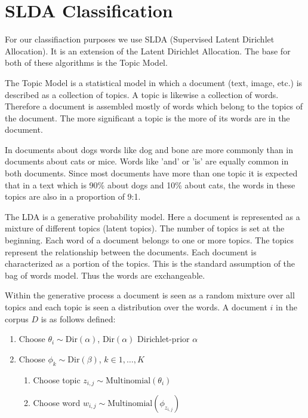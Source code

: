\documentclass[12pt,paper=a4,nenglish]{scrreprt}
\begin{document}
\section{SLDA Classification}
\label{sec:slda_classification}

For our classifiaction purposes we use SLDA (Supervised Latent Dirichlet Allocation). 
It is an extension of the Latent Dirichlet Allocation. 
The base for both of these algorithms is the Topic Model.

The Topic Model is a statistical model in which a document (text, image, etc.) is described as a collection of topics. 
A topic is likewise a collection of words. Therefore a document is assembled
mostly of words which belong to the topics of the document.
The more significant a topic is the more of its words are in the document.

In documents about dogs words like dog and bone are more commonly than in
documents about cats or mice.
Words like 'and' or 'is' are equally common in both documents. 
Since most documents have more than one topic it is expected that in a text
which is 90\% about dogs and 10\% about cats, the words in these topics are also
in a proportion of 9:1.

The LDA is a generative probability model. 
Here a document is represented as a mixture of different topics (latent topics). 
The number of topics is set at the beginning. Each word of a document belongs to one or more topics. 
The topics represent the relationship between the documents. Each document is characterized as a portion of the topics. 
This is the standard assumption of the bag of words model. 
Thus the words are exchangeable.

Within the generative process a document is seen as a random mixture over all
topics and each topic is seen a distribution over the words.
A document $ i $ in the corpus $ D $ is as follows defined:

\begin{enumerate}
\item Choose $ \theta_i \sim \text{Dir}(\alpha) $, $ \text{Dir}(\alpha) $
Dirichlet-prior $ \alpha $
\item Choose $ \phi_k \sim \text{Dir}(\beta) $, $ k \in {1,\dots,K} $
	\begin{enumerate}
	\item Choose topic $ z_{i,j} \sim \text{Multinomial}(\theta_i) $
	\item Choose word $ w_{i,j} \sim \text{Multinomial}(\phi_{z_{i,j}}) $
	\end{enumerate}
\end{enumerate}
\end{document}
